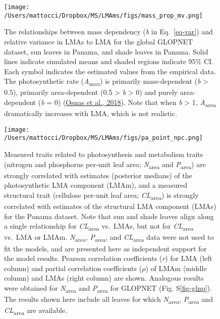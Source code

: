 \documentclass[
  12pt,
  a4paper,
,tablecaptionabove
]{scrartcl}
\begin{document}
\begin{figure}

{\centering \texttt{[image: /Users/mattocci/Dropbox/MS/LMAms/figs/mass\_prop\_mv.png]}

}

\caption{\label{fig-massplt}The relationships between mass dependency
(\emph{b} in Eq.~\ref{eq-var}) and relative variance in LMAs to LMA for
the global GLOPNET dataset, sun leaves in Panama, and shade leaves in
Panama. Solid lines indicate simulated means and shaded regions indicate
95\% CI. Each symbol indicates the estimated values from the empirical
data. The photosynthetic rate (\emph{A}\textsubscript{max}) is primarily
mass-dependent (\emph{b} \textgreater{} 0.5), primarily area-dependent
(0.5 \textgreater{} \emph{b} \textgreater{} 0) and purely area-dependent
(\emph{b} = 0) (\protect\hyperlink{ref-Osnas2018}{Osnas et al., 2018}).
Note that when \emph{b} \textgreater{} 1, \emph{A}\textsubscript{area}
dramatically increases with LMA, which is not realistic.}

\end{figure}

\newpage

\begin{figure}

{\centering \texttt{[image: /Users/mattocci/Dropbox/MS/LMAms/figs/pa\_point\_npc.png]}

}

\caption{\label{fig-PA-NPC}Measured traits related to photosynthesis and
metabolism traits (nitrogen and phosphorus per-unit leaf area;
\emph{N}\textsubscript{area} and \emph{P}\textsubscript{area}) are
strongly correlated with estimates (posterior medians) of the
photosynthetic LMA component (LMAm), and a measured structural trait
(cellulose per-unit leaf area; \emph{CL}\textsubscript{area}) is
strongly correlated with estimates of the structural LMA component
(LMAs) for the Panama dataset. Note that sun and shade leaves align
along a single relationship for \emph{CL}\textsubscript{area} vs.~LMAs,
but not for \emph{CL}\textsubscript{area} vs.~LMA or LMAm.
\emph{N}\textsubscript{area}, \emph{P}\textsubscript{area}, and
\emph{CL}\textsubscript{area} data were not used to fit the models, and
are presented here as independent support for the model results. Pearson
correlation coefficients (\emph{r}) for LMA (left column) and partial
correlation coefficients (\(\rho\)) of LMAm (middle column) and LMAs
(right column) are shown. Analogous results were obtained for
\emph{N}\textsubscript{area} and \emph{P}\textsubscript{area} for
GLOPNET (Fig. S\ref{fig-glnp}). The results shown here include all
leaves for which \emph{N}\textsubscript{area},
\emph{P}\textsubscript{area} and \emph{CL}\textsubscript{area} are
available.}

\end{figure}
\end{document}
